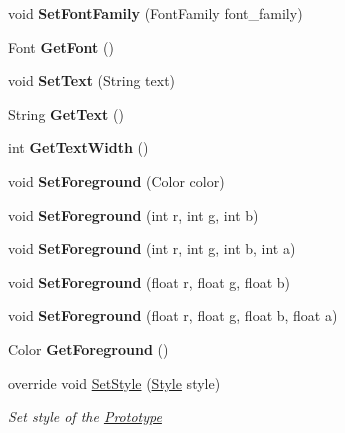 \begin{DoxyCompactItemize}
\mbox{\label{class_space_v_i_l_1_1_tree_item_a19c9cdba70d31567b282089a2ed7b363}} 
void {\bfseries Set\+Font\+Family} (Font\+Family font\+\_\+family)
\item 
\mbox{\label{class_space_v_i_l_1_1_tree_item_ae3b5c4786ef1e2e576681001e0dad855}} 
Font {\bfseries Get\+Font} ()
\item 
\mbox{\label{class_space_v_i_l_1_1_tree_item_a6dea0691253fa83d5f907657f006d34b}} 
void {\bfseries Set\+Text} (String text)
\item 
\mbox{\label{class_space_v_i_l_1_1_tree_item_a4b62bdd78144b9479fdf96d9549a6679}} 
String {\bfseries Get\+Text} ()
\item 
\mbox{\label{class_space_v_i_l_1_1_tree_item_a239574e6430106bcdc6bdc77f6d1dd4a}} 
int {\bfseries Get\+Text\+Width} ()
\item 
\mbox{\label{class_space_v_i_l_1_1_tree_item_a11e925c54ca2253ec48ba097709b1527}} 
void {\bfseries Set\+Foreground} (Color color)
\item 
\mbox{\label{class_space_v_i_l_1_1_tree_item_a623ecc5e3d4c0aca2f0d621f376039c9}} 
void {\bfseries Set\+Foreground} (int r, int g, int b)
\item 
\mbox{\label{class_space_v_i_l_1_1_tree_item_ac94515b8a9d7a3f12eeda12ed69e80c3}} 
void {\bfseries Set\+Foreground} (int r, int g, int b, int a)
\item 
\mbox{\label{class_space_v_i_l_1_1_tree_item_ab0387e98f16be77e9576f007714f6996}} 
void {\bfseries Set\+Foreground} (float r, float g, float b)
\item 
\mbox{\label{class_space_v_i_l_1_1_tree_item_a0b4830add8fc7dd697aed6572a210569}} 
void {\bfseries Set\+Foreground} (float r, float g, float b, float a)
\item 
\mbox{\label{class_space_v_i_l_1_1_tree_item_acc4304b0f348207ce7699216448c2881}} 
Color {\bfseries Get\+Foreground} ()
\item 
override void \mbox{\hyperlink{class_space_v_i_l_1_1_tree_item_ab12f4f097b10e2a0c7f0b5fd311449d4}{Set\+Style}} (\mbox{\hyperlink{class_space_v_i_l_1_1_decorations_1_1_style}{Style}} style)
\begin{DoxyCompactList}\small\item\em Set style of the \mbox{\hyperlink{class_space_v_i_l_1_1_prototype}{Prototype}} \end{DoxyCompactList}\end{DoxyCompactItemize}

